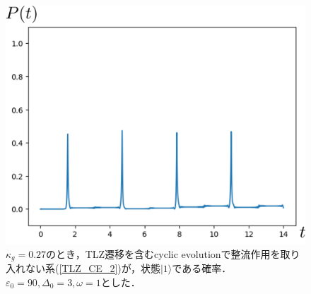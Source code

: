 \begin{figure}[htbp]
  \centering
  \includegraphics[scale=0.5]{figures/TLZ_CE_perfect.png}
  \caption{$\kappa_g = 0.27$のとき，TLZ遷移を含むcyclic evolutionで整流作用を取り入れない系(\ref{TLZ_CE_2})が，状態$|1\rangle$である確率．$\varepsilon_0=90, \Delta_0 = 3, \omega=1$とした．}
  \label{fig:TLZ_CE_perfect}
\end{figure}